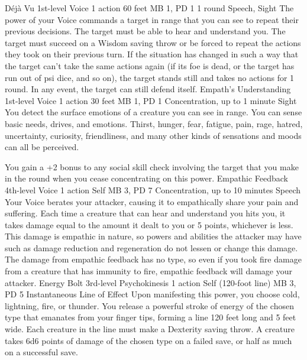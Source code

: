 \DndPowerHeader%
    {Déjà Vu\label{pwr:déjà_vu}}
    {1st-level Voice}
    {1 action}
    {60 feet}
    {MB 1, PD 1}
    {1 round}
    {Speech, Sight}
The power of your Voice commands a target
in range that you can see to repeat their previous decisions.
The target must be able to hear and understand you.
The target must succeed on a Wisdom saving throw or be forced
to repeat the actions they took on their previous turn. If
the situation has changed in such a way that the target can't
take the same actions again (if its foe is dead, or the target
has run out of psi dice, and so on), the target stands still
and takes no actions for 1 round. In any event, the target
can still defend itself.
\DndPowerHeader%
    {Empath's Understanding\label{pwr:empaths_understanding}}
    {1st-level Voice}
    {1 action}
    {30 feet}
    {MB 1, PD 1}
    {Concentration, up to 1 minute}
    {Sight}
You detect the surface emotions of a creature
you can see in range. You can sense basic needs, drives, and
emotions. Thirst, hunger, fear, fatigue, pain, rage, hatred,
uncertainty, curiosity, friendliness, and many other kinds
of sensations and moods can all be perceived.

You gain a +2 bonus to any social skill check involving the
target that you make in the round when you cease concentrating
on this power.
\DndPowerHeader%
    {Empathic Feedback\label{pwr:empathic_feedback}}
    {4th-level Voice}
    {1 action}
    {Self}
    {MB 3, PD 7}
    {Concentration, up to 10 minutes}
    {Speech}
Your Voice berates your attacker, causing
it to empathically share your pain and suffering. Each time
a creature that can hear and understand you hits you,
it takes damage equal to the amount it
dealt to you or 5 points, whichever is less. This damage is
empathic in nature, so powers and abilities the attacker may
have such as damage reduction and regeneration do not lessen
or change this damage. The damage from empathic feedback has
no type, so even if you took fire damage from a creature that
has immunity to fire, empathic feedback will damage your attacker.
\DndPowerHeader%
    {Energy Bolt\label{pwr:energy_bolt}}
    {3rd-level Psychokinesis}
    {1 action}
    {Self (120-foot line)}
    {MB 3, PD 5}
    {Instantaneous}
    {Line of Effect}
Upon manifesting this power, you choose cold,
lightning, fire, or thunder. You release a powerful stroke
of energy of the chosen type that emanates from your finger
tips, forming a line 120 feet long and 5 feet wide. Each creature
in the line must make a Dexterity saving throw. A creature
takes 6d6 points of damage of the chosen type on a failed
save, or half as much on a successful save.

